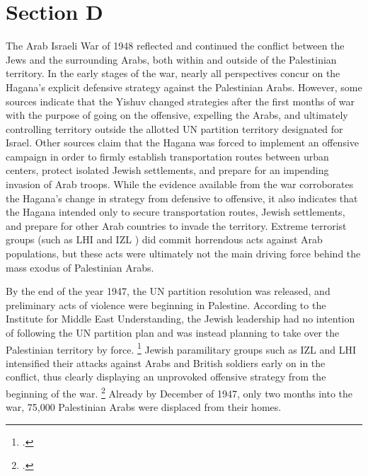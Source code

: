 \documentclass{turabian-researchpaper}
\begin{document}
\section{Section D}

The Arab Israeli War of 1948 reflected and continued the conflict between the Jews and the surrounding Arabs, both within and outside of the Palestinian territory.  In the early stages of the war, nearly all perspectives concur on the Hagana's explicit defensive strategy against the Palestinian Arabs.  However, some sources indicate that the Yishuv changed strategies after the first months of war with the purpose of going on the offensive, expelling the Arabs, and ultimately controlling territory outside the allotted UN partition territory designated for Israel.  Other sources claim that the Hagana was forced to implement an offensive campaign in order to firmly establish transportation routes between urban centers, protect isolated Jewish settlements, and prepare for an impending invasion of Arab troops.  While the evidence available from the war corroborates the Hagana's change in strategy from defensive to offensive, it also indicates that the Hagana intended only to secure transportation routes, Jewish settlements, and prepare for other Arab countries to invade the territory.  Extreme terrorist groups (such as LHI and IZL ) did commit horrendous acts against Arab populations, but these acts were ultimately not the main driving force behind the mass exodus of Palestinian Arabs.

By the end of the year 1947, the UN partition resolution was released, and preliminary acts of violence were beginning in Palestine.  According to the Institute for Middle East Understanding, the Jewish leadership had no intention of following the UN partition plan and was instead planning to take over the Palestinian territory by force.
\footcite{nabka}
Jewish paramilitary groups such as IZL and LHI intensified their attacks against Arabs and British soldiers early on in the conflict, thus clearly displaying an unprovoked offensive strategy from the beginning of the war.
\footcite{nabka}
Already by December of 1947, only two months into the war, 75,000 Palestinian Arabs were displaced from their homes.
\end{document}
